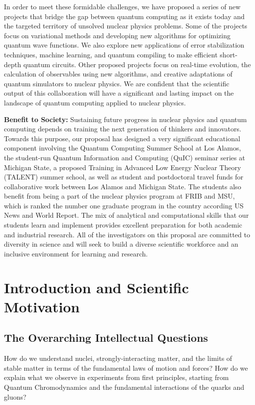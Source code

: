 \documentclass[10pt]{article}
\begin{document}
In order to meet these formidable challenges, we have proposed a series of new projects that bridge the gap between quantum computing as it exists today and the targeted territory of unsolved nuclear physics problems.  Some of the projects focus on variational methods and developing new algorithms for optimizing quantum wave functions.  We also explore new applications of error stabilization techniques, machine learning, and quantum compiling to make efficient short-depth quantum circuits. Other proposed projects focus on real-time evolution, the calculation of observables using new algorithms, and creative adaptations of quantum simulators to nuclear physics.  We are confident that the scientific output of this collaboration will have a significant and lasting impact on the landscape of quantum computing applied to nuclear physics.

{\bf Benefit to Society:}  Sustaining future progress in nuclear physics and quantum computing depends on training the next generation of thinkers and innovators.  Towards this purpose, our proposal has designed a very significant educational component involving the Quantum Computing Summer School at Los Alamos, the student-run Quantum Information and Computing (QuIC) seminar series at Michigan State, a proposed Training in Advanced Low Energy Nuclear Theory (TALENT) summer school, as well as student and postdoctoral travel funds for collaborative work between Los Alamos and Michigan State.  The students also benefit from being a part of the nuclear physics program at FRIB and MSU, which is ranked the number one graduate program in the country according US News and World Report. The mix of analytical and computational skills that our students learn and implement provides excellent preparation for both academic and industrial research. All of the investigators on this proposal are committed to diversity in science and will seek to build a diverse scientific workforce and an inclusive environment for learning and research.

\section{Introduction and Scientific Motivation}

\subsection{The Overarching Intellectual Questions}

How do we understand nuclei, strongly-interacting matter, and the limits of
stable matter in terms of the fundamental laws of motion and
forces?  How do we explain what we observe in experiments from first principles,
starting from Quantum Chromodynamics and the fundamental interactions of the quarks and gluons?
\end{document}
